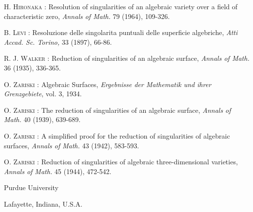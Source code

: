\begin{thebibliography}{99}
 \textsc{H. Hironaka :} Resolution of singularities of an algebraic variety over a field of characteristic zero, {\em Annals of Math.} 79 (1964), 109-326.

 \textsc{B. Levi :} Resoluzione delle singolarita puntuali delle superficie algebriche, {\em Atti Accad. Sc. Torino,} 33 (1897), 66-86.

 \textsc{R. J. Walker :} Reduction of singularities of an algebraic surface, {\em Annals of Math.} 36 (1935), 336-365.

 \textsc{O. Zariski :} Algebraic Surfaces, {\em Ergebnisse der Mathematik und ihrer Grenzgebiete}, vol. 3, 1934.

 \textsc{O. Zariski :} The reduction of singularities of an algebraic surface, {\em Annals of Math.} 40 (1939), 639-689.

 \textsc{O. Zariski :} A simplified proof for the reduction of singularities of algebraic surfaces, {\em Annals of Math.} 43 (1942), 583-593.

 \textsc{O. Zariski :} Reduction of singularities of algebraic three-dimensional varieties, {\em Annals of Math.} 45 (1944), 472-542.
\end{thebibliography}

\medskip
\noindent
{\small Purdue University}

\noindent
{\small Lafayette, Indiana, U.S.A.}


